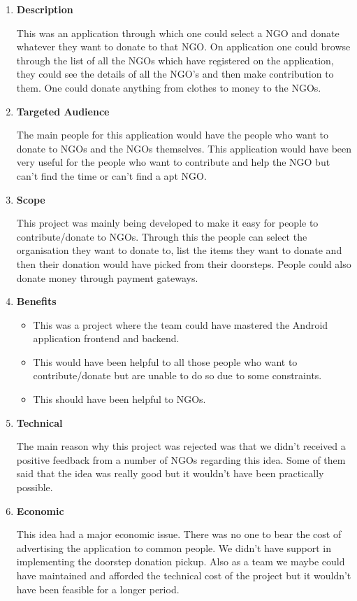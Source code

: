\documentclass[fleqn,10pt]{../SelfArx} %
\begin{document}
\vspace{0.5cm}
\begin{enumerate}
\item \textbf{Description}

This was an application through which one could select a NGO and donate whatever they want to donate to that NGO. On application one could browse through the list of all the NGOs which have registered on the application, they could see the details of all the NGO's and then make contribution to them. One could donate anything from clothes to money to the NGOs.

\item \textbf{Targeted Audience}

The main people for this application would have the people who want to donate to NGOs and the NGOs themselves. This application would have been very useful for the people who want to contribute and help the NGO but can't find the time or can't find a apt NGO.

\item \textbf{Scope}

This project was mainly being developed to make it easy for people to contribute/donate to NGOs. Through this the people can select the organisation they want to donate to, list the items they want to donate and then their donation would have picked from their doorsteps. People could also donate money through payment gateways.

\item \textbf{Benefits}

\begin{itemize}
    \item	This was a project where the team could have mastered the Android application frontend and backend.
  \item		This would have been helpful to all those people who want to contribute/donate but are unable to do so due to some constraints.
  \item		This should have been helpful to NGOs.
\end{itemize}

\item \textbf{Technical}

The main reason why this project was rejected was that we didn't received a positive feedback from a number of NGOs regarding this idea. Some of them said that the idea was really good but it wouldn't have been practically possible.

\item \textbf{Economic}

This idea had a major economic issue. There was no one to bear the cost of advertising the application to common people. We didn't have support in implementing the doorstep donation pickup. Also as a team we maybe could have maintained and afforded the technical cost of the project but it wouldn't have been feasible for a longer period. 
\end{enumerate}
\end{document}
